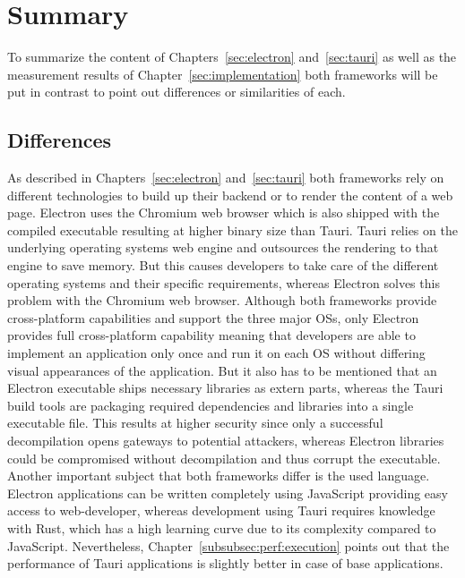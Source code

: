 \section{Summary}
\label{sec:summary}
To summarize the content of Chapters~\ref{sec:electron} and~\ref{sec:tauri} as well as the measurement results of Chapter~\ref{sec:implementation}
both frameworks will be put in contrast to point out differences or similarities of each.
\subsection{Differences}\label{subsec:differences}
As described in Chapters~\ref{sec:electron} and~\ref{sec:tauri} both frameworks rely on different technologies to build up their backend or to render the content of a web page.
Electron uses the Chromium web browser which is also shipped with the compiled executable resulting at higher binary size than Tauri.
Tauri relies on the underlying operating systems web engine and outsources the rendering to that engine to save memory.
But this causes developers to take care of the different operating systems and their specific requirements, whereas Electron solves this problem with the Chromium web browser.
Although both frameworks provide cross-platform capabilities and support the three major \ac{OS}s, only Electron provides full cross-platform capability meaning that developers are able to implement an application only once
and run it on each \ac{OS} without differing visual appearances of the application.
But it also has to be mentioned that an Electron executable ships necessary libraries as extern parts, whereas the Tauri build tools are packaging required dependencies and libraries into a single executable file.
This results at higher security since only a successful decompilation opens gateways to potential attackers, whereas Electron libraries could be compromised without decompilation and thus corrupt the executable.
Another important subject that both frameworks differ is the used language.
Electron applications can be written completely using JavaScript providing easy access to web-developer, whereas development using Tauri requires knowledge with Rust, which has a high learning curve due to its complexity compared to JavaScript.
Nevertheless, Chapter~\ref{subsubsec:perf:execution} points out that the performance of Tauri applications is slightly better in case of base applications.
